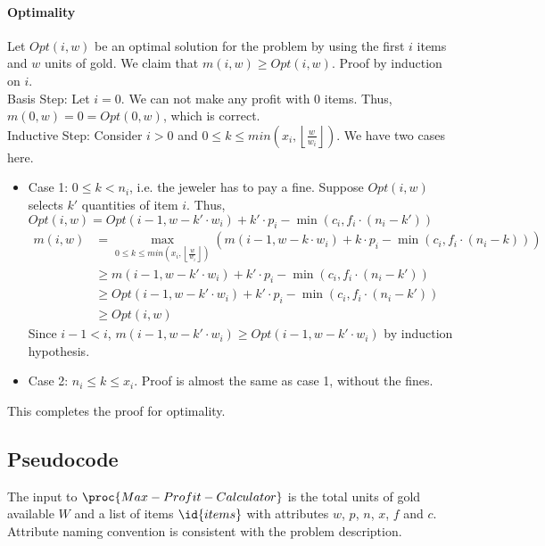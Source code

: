 \documentclass{article}
\begin{document}
\paragraph{Optimality}
Let $Opt(i, w)$ be an optimal solution for the problem by using the first $i$ items and $w$ units of gold. We claim that $m(i, w) \geq Opt(i, w)$. Proof by induction on $i$.\\
Basis Step: Let $i = 0$. We can not make any profit with 0 items. Thus, $m(0, w) = 0 = Opt(0, w)$, which is correct.\\
Inductive Step: Consider $i > 0$ and $0 \leq k \leq min\left(x_i, \left\lfloor\frac{w}{w_i}\right\rfloor\right)$. We have two cases here.
\begin{itemize}
	\item Case 1: $0 \leq k < n_i$, i.e. the jeweler has to pay a fine. Suppose $Opt(i, w)$ selects $k'$ quantities of item $i$. Thus, $Opt(i, w) = Opt(i-1, w-k' \cdot w_i) + k' \cdot p_i - \min(c_i, f_i \cdot(n_i - k'))$
	\begin{align*}
	m(i, w) &= \max\limits_{0 \leq k \leq min\left(x_i, \left\lfloor\frac{w}{w_i}\right\rfloor\right)}(m(i-1, w-k \cdot w_i) + k \cdot p_i - \min(c_i, f_i \cdot(n_i - k)))\\
	& \geq  m(i-1, w-k' \cdot w_i) + k' \cdot p_i - \min(c_i, f_i \cdot(n_i - k'))\\
	& \geq Opt(i-1, w-k' \cdot w_i) + k' \cdot p_i - \min(c_i, f_i \cdot(n_i - k'))\\
	& \geq Opt(i, w)
	\end{align*}
	Since $i-1 < i$, $m(i-1,w-k' \cdot w_i) \geq Opt(i-1,w-k' \cdot w_i)$ by induction hypothesis.
	
	\item Case 2: $n_i \leq k \leq x_i$. Proof is almost the same as case 1, without the fines.
\end{itemize}

This completes the proof for optimality.

\subsection*{Pseudocode}

The input to $\proc{Max-Profit-Calculator}$ is the total units of gold available $W$ and a list of items $\id{items}$ with attributes $w$, $p$, $n$, $x$, $f$ and $c$. Attribute naming convention is consistent with the problem description.
\end{document}
